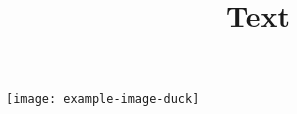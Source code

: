 \documentclass{beamer}
\title{Text}
\begin{document}
\begin{frame}
\titlepage
\centering
\texttt{[image: example-image-duck]}
\end{frame}
\end{document}
